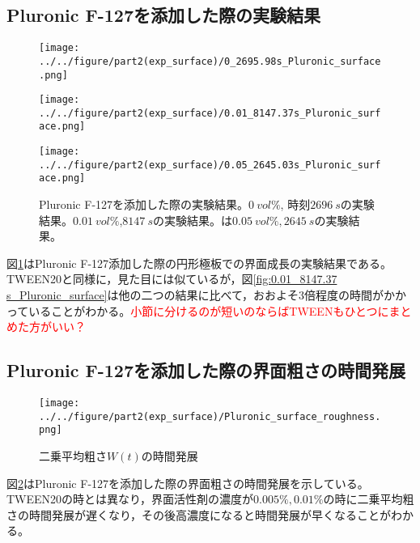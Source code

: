 \documentclass[autodetect-engine,dvi=dvipdfmx,a4paper,ja=standard,oneside,openany,11pt,draft]{bxjsbook}
\begin{document}
\subsection{Pluronic F-127を添加した際の実験結果}
\begin{figure}[htbp]
  \begin{minipage}
    {0.32\textwidth}
    \subcaption{}
    \centering
    \texttt{[image: ../../figure/part2(exp\_surface)/0\_2695.98s\_Pluronic\_surface.png]}
    \label{fig:0_2695.98 s_Pluronic_surface}
  \end{minipage}
  \begin{minipage}
    {0.32\textwidth}
    \subcaption{}
    \centering
    \texttt{[image: ../../figure/part2(exp\_surface)/0.01\_8147.37s\_Pluronic\_surface.png]}
    \label{fig:0.01_8147.37 s_Pluronic_surface}
  \end{minipage}
  \begin{minipage}
    {0.32\textwidth}
    \subcaption{}
    \centering
    \texttt{[image: ../../figure/part2(exp\_surface)/0.05\_2645.03s\_Pluronic\_surface.png]}
    \label{fig:0.05_2645.03 s_Pluronic_surface}
  \end{minipage}
  \caption{Pluronic F-127を添加した際の実験結果。$\SI{0}{vol\%}$, 時刻$\SI{2696}{s}$の実験結果。$\SI{0.01}{vol\%}$,$\SI{8147}{s}$の実験結果。は$\SI{0.05}{vol\%}, \SI{2645}{s}$の実験結果。}
  \label{fig:Pluronic_surface}
\end{figure}
図\ref{fig:Pluronic_surface}はPluronic F-127添加した際の円形極板での界面成長の実験結果である。TWEEN20と同様に，見た目には似ているが，図\ref{fig:0.01_8147.37 s_Pluronic_surface}は他の二つの結果に比べて，おおよそ3倍程度の時間がかかっていることがわかる。\textcolor{red}{小節に分けるのが短いのならばTWEENもひとつにまとめた方がいい？}
\subsection{Pluronic F-127を添加した際の界面粗さの時間発展}
\begin{figure}[htbp]
  \centering
  \texttt{[image: ../../figure/part2(exp\_surface)/Pluronic\_surface\_roughness.png]}
  \caption{二乗平均粗さ$W(t)$の時間発展}
  \label{fig:surface_roughness_Pluronic}
\end{figure}
図\ref{fig:surface_roughness_Pluronic}はPluronic F-127を添加した際の界面粗さの時間発展を示している。TWEEN20の時とは異なり，界面活性剤の濃度が$0.005\%,0.01\%$の時に二乗平均粗さの時間発展が遅くなり，その後高濃度になると時間発展が早くなることがわかる。
\ifdraft{
  
  
}{}
\end{document}
